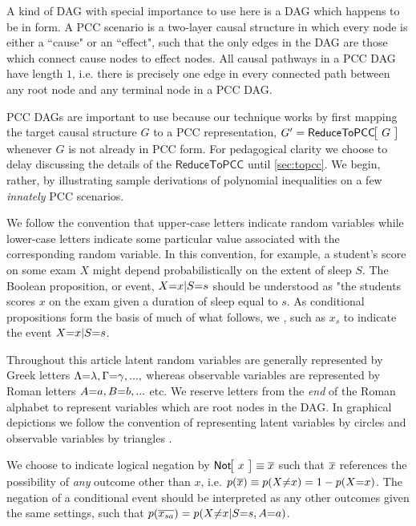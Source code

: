 A kind of DAG with special importance to use here is a DAG which happens to be in  form. A PCC scenario is a two-layer causal structure in which every node is either a ``cause" or an ``effect", such that the only edges in the DAG are those which connect cause nodes to effect nodes. All causal pathways in a PCC DAG have length $1$, i.e. there is precisely one edge in every connected path between any root node and any terminal node in a PCC DAG.

PCC DAGs are important to use because our technique works by first mapping the target causal structure $G$ to a PCC representation, $G'=\NamedFunction{ReduceToPCC}{\!G\!}$ whenever $G$ is not already in PCC form. For pedagogical clarity we choose to delay discussing the details of the $\mathsf{ReduceToPCC}$ until \cref{sec:topcc}. We begin, rather, by illustrating sample derivations of polynomial inequalities on a few \emph{innately} PCC scenarios.

We follow the convention that upper-case letters indicate random variables while lower-case letters indicate some particular value associated with the corresponding random variable. In this convention, for example, a student's score on some exam $X$ might depend probabilistically on the extent of sleep $S$. The Boolean proposition, or {event}, $X\mathord{=}x|S\mathord{=}s$ should be understood as "the students scores $x$ on the exam given a duration of sleep equal to $s$. As conditional propositions form the basis of much of what follows, we , such as $x_s$ to indicate the event $X\mathord{=}x | S\mathord{=}s$. 

Throughout this article latent random variables are generally represented by Greek letters $\Lambda\mathord{=}\lambda,\Gamma\mathord{=}\gamma,...,$ whereas observable variables are represented by Roman letters $A\mathord{=}a,B\mathord{=}b,...$ etc. We reserve letters from the \emph{end} of the Roman alphabet to represent variables which are root nodes in the DAG. In graphical depictions we follow the convention of representing latent variables by circles and observable variables by triangles \cite{pusey2014gdag}.

We choose to indicate logical negation by $\NamedFunction{Not}{\!x\!}\equiv\n{x}$ such that $\overline{x}$ references the possibility of \emph{any} outcome other than $x$, i.e. $p\lparen\overline{x}\rparen\equiv p\lparen X\mathord{\neq}x\rparen=1-p\lparen X\mathord{=}x\rparen$. The negation of a conditional event should be interpreted as any other outcomes given the same settings, such that $p\lparen\overline{x_{s a}}\rparen=p\lparen X\mathord{\neq}x|S\mathord{=}s,A\mathord{=}a\rparen$.

